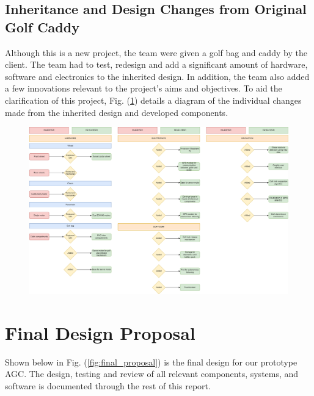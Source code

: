 \documentclass[11pt,landscape]{article}
\begin{document}
\begin{multicols}{3}
\subsection{Inheritance and Design Changes from Original Golf Caddy}
Although this is a new project, the team were given a golf bag and caddy by the
client. The team had to test, redesign and add a significant amount of hardware,
software and electronics to the inherited design. In addition, the team also
added a few innovations relevant to the project’s aims and objectives. To aid
the clarification of this project, Fig. (\ref{fig:inheritance}) details a diagram of the
individual changes made from the inherited design and developed components. 
\end{multicols}
\newpage

\begin{figure}[H]
    \begin{center}
        \includegraphics[width=\textwidth]{inheritance.png}
    \end{center}
    \label{fig:inheritance}
\end{figure}


\newpage

\section{Final Design Proposal}
Shown below in Fig. (\ref{fig:final_proposal}) is the final design for our
prototype AGC. The design, testing and review of all relevant components, systems, and software is
documented through the rest of this report.
\end{document}
